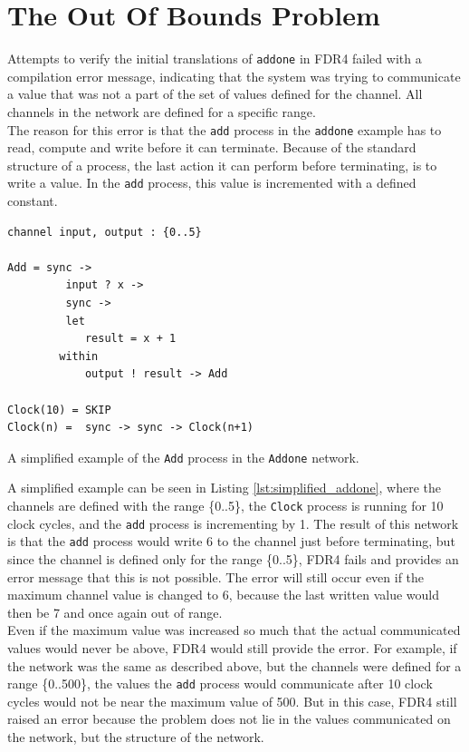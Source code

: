 \section{The Out Of Bounds Problem}
Attempts to verify the initial \cspm{} translations of \texttt{addone} in FDR4 failed with a compilation error message, indicating that the system was trying to communicate a value that was not a part of the set of values defined for the channel. All channels in the network are defined for a specific range. \\

The reason for this error is that the \texttt{add} process in the \texttt{addone} example has to read, compute and write before it can terminate. Because of the standard structure of a process, the last action it can perform before terminating, is to write a value. In the \texttt{add} process, this value is incremented with a defined constant.\\

\begin{listing}
\begin{verbatim}
channel input, output : {0..5}

Add = sync ->
         input ? x ->
         sync ->
         let
            result = x + 1
        within
            output ! result -> Add

Clock(10) = SKIP
Clock(n) =  sync -> sync -> Clock(n+1)
\end{verbatim}
\caption{A simplified example of the \texttt{Add} process in the \texttt{Addone} network.}
\label{lst:simplified_addone}
\end{listing}
A simplified example can be seen in Listing \ref{lst:simplified_addone}, where the channels are defined with the range \{0..5\}, the \texttt{Clock} process is running for 10 clock cycles, and the \texttt{add} process is incrementing by 1.
The result of this network is that the \texttt{add} process would write 6 to the channel just before terminating, but since the channel is defined only for the range \{0..5\}, FDR4 fails and provides an error message that this is not possible. The error will still occur even if the maximum channel value is changed to 6, because the last written value would then be 7 and once again out of range. \\

Even if the maximum value was increased so much that the actual communicated values would never be above, FDR4 would still provide the error.
For example, if the network was the same as described above, but the channels were defined for a range \{0..500\}, the values the \texttt{add} process would communicate after 10 clock cycles would not be near the maximum value of 500. But in this case, FDR4 still raised an error because the problem does not lie in the values communicated on the network, but the structure of the network. \\

